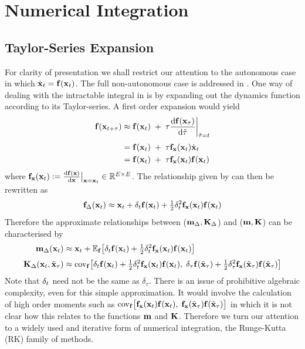 \section{Numerical Integration}
\subsection{Taylor-Series Expansion}
For clarity of presentation we shall restrict our attention to the autonomous case in which $\dot{\mathbf{x}}_t = \mathbf{f}(\mathbf{x}_t)$. The full non-autonomous case is addressed in . One way of dealing with the intractable integral in  is by expanding out the dynamics function according to its Taylor-series. A first order expansion would yield
\begin{align*}
\bff(\bx_{t+\tau}) &\approx \bff(\bx_t) \;+\; 
\tau \diff{\bff(\bx_{\tilde\tau})}{\tilde\tau}\bigg|_{\tilde\tau=t}  \\[0.1cm]
%
&=  \bff(\bx_t) \;+\; 
\tau \bff_\bx(\bx_t)  \dot\bx_t  \\
&=  \bff(\bx_t) \;+\; 
\tau \bff_\bx(\bx_t) \bff(\bx_t) 
\end{align*}
where $\mathbf{f}_{\mathbf{x}}(\mathbf{x}_t) := \frac{\mathrm{d} \mathbf{f}(\mathbf{x})}{\mathrm{d} \mathbf{x}}\big|_{\mathbf{x}=\mathbf{x}_t} \in \mathbb{R}^{E\times E}$. The relationship given by  can then be rewritten as
\begin{equation}
\mathbf{f}_{\Delta}(\mathbf{x}_t) \approx \mathbf{x}_t + 
\delta_t \mathbf{f}(\mathbf{x}_t) + \tfrac{1}{2}\delta_t^2 \mathbf{f}_{\mathbf{x}}(\mathbf{x}_t) \mathbf{f}(\mathbf{x}_t)
\label{eqn:intdt}
\end{equation}
Therefore the approximate relationships between ($\mathbf{m}_{\Delta}, \mathbf{K}_{\Delta}$) and ($\mathbf{m}, \mathbf{K}$) can be characterised by
\begin{align*}
\bmm_{\Delta}(\bx_t) &\approx \bx_t + 
\EE_\bff\big[\Dt \bff(\bx_t) + \tfrac{1}{2}\Dt^2 \bff_\bx(\bx_t) \bff(\bx_t)\big] \\[0.1cm]
%
\bK_{\Delta}(\bx_t,\tbx_\tau) &\approx 
\cov_\bff\big[\Dt \bff(\bx_t) +  \tfrac{1}{2}\Dt^2 \bff_\bx(\bx_t) \bff(\bx_t),\;
\delta_{\tau} \bff(\tbx_\tau) +  \tfrac{1}{2}\delta_{\tau}^2 \bff_\bx(\tbx_\tau) \bff(\tbx_\tau)\big]
\end{align*}
Note that $\delta_t$ need not be the same as $\delta_\tau$. There is an issue of prohibitive algebraic complexity, even for this simple approximation. It would involve the calculation of high order moments such as $\mathrm{cov}_{\mathbf{f}}\big[\mathbf{f}_{\mathbf{x}}(\mathbf{x}_t) \mathbf{f}(\mathbf{x}_t), \;\mathbf{f}_{\mathbf{x}}(\tilde{\mathbf{x}}_\tau) \mathbf{f}(\tilde{\mathbf{x}}_\tau) \big]$ in which it is not clear how this relates to the functions $\mathbf{m}$ and $\mathbf{K}$. Therefore we turn our attention to a widely used and iterative form of numerical integration, the Runge-Kutta (RK) family of methods.





